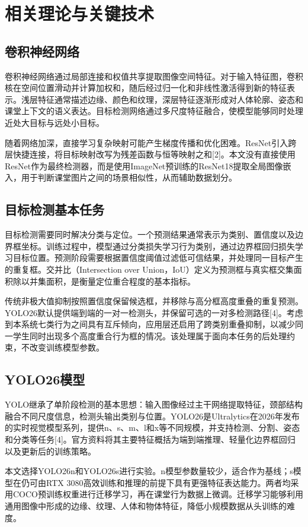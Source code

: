 \documentclass[12pt,hyperref,a4paper,UTF8]{ctexart}
\begin{document}
\section{相关理论与关键技术}
\subsection{卷积神经网络}
卷积神经网络通过局部连接和权值共享提取图像空间特征。对于输入特征图，卷积核在空间位置滑动并计算加权和，随后经过归一化和非线性激活得到新的特征表示。浅层特征通常描述边缘、颜色和纹理，深层特征逐渐形成对人体轮廓、姿态和课堂上下文的语义表达。目标检测网络通过多尺度特征融合，使模型能够同时处理近处大目标与远处小目标。\par
随着网络加深，直接学习复杂映射可能产生梯度传播和优化困难。ResNet引入跨层快捷连接，将目标映射改写为残差函数与恒等映射之和[2]。本文没有直接使用ResNet作为最终检测器，而是使用ImageNet预训练的ResNet18提取全局图像嵌入，用于判断课堂图片之间的场景相似性，从而辅助数据划分。\par
\subsection{目标检测基本任务}
目标检测需要同时解决分类与定位。一个预测结果通常表示为类别、置信度以及边界框坐标。训练过程中，模型通过分类损失学习行为类别，通过边界框回归损失学习目标位置。预测阶段需要根据置信度阈值过滤低可信结果，并处理同一目标产生的重复框。交并比（Intersection over Union，IoU）定义为预测框与真实框交集面积除以并集面积，是衡量定位重合程度的基本指标。\par
传统非极大值抑制按照置信度保留候选框，并移除与高分框高度重叠的重复预测。YOLO26默认提供端到端的一对一检测头，并保留可选的一对多检测路径[4]。考虑到本系统七类行为之间具有互斥倾向，应用层还启用了跨类别重叠抑制，以减少同一学生同时出现多个高度重合行为框的情况。该处理属于面向本任务的后处理约束，不改变训练模型参数。\par
\subsection{YOLO26模型}
YOLO继承了单阶段检测的基本思想：输入图像经过主干网络提取特征，颈部结构融合不同尺度信息，检测头输出类别与位置。YOLO26是Ultralytics在2026年发布的实时视觉模型系列，提供n、s、m、l和x等不同规模，并支持检测、分割、姿态和分类等任务[4]。官方资料将其主要特征概括为端到端推理、轻量化边界框回归以及更新后的训练策略。\par
本文选择YOLO26n和YOLO26s进行实验。n模型参数量较少，适合作为基线；s模型在仍可由RTX 3080高效训练和推理的前提下具有更强特征表达能力。两者均采用COCO预训练权重进行迁移学习，再在课堂行为数据上微调。迁移学习能够利用通用图像中形成的边缘、纹理、人体和物体特征，降低小规模数据从头训练的难度。\par
\end{document}
